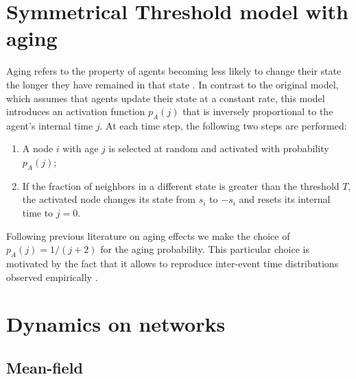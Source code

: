 \section{\label{Symmetrical Threshold model with aging} Symmetrical Threshold model with aging}
	
Aging refers to the property of agents becoming less likely to change their state the longer they have remained in that state \cite{stark-2008,artime-2017,artime-2018,peralta-2020A,peralta-2020C,chen-2020,Abella-2022,Abella-2022-AME}. In contrast to the original model, which assumes that agents update their state at a constant rate, this model introduces an activation function $p_A (j)$ that is inversely proportional to the agent's internal time $j$. At each time step, the following two steps are performed:
\begin{enumerate}
    \item A node $i$ with age $j$ is selected at random and activated with probability $p_A(j)$;
    \item If the fraction of neighbors in a different state is greater than the threshold $T$, the activated node changes its state from $s_i$ to $-s_i$ and resets its internal time to $j=0$.
\end{enumerate}
Following previous literature on aging effects \cite{fernandez-gracia-2011,peralta-2018,artime-2018,Abella-2022,Abella-2022-AME} we make the choice of $p_A(j) = 1/(j+2)$ for the aging probability. This particular choice is motivated by the fact that it allows to reproduce inter-event time distributions observed empirically \cite{rybski-2009,artime-2017}. 

\section{\label{sec:Dynamics on networks} Dynamics on networks}

\subsection{Mean-field}

